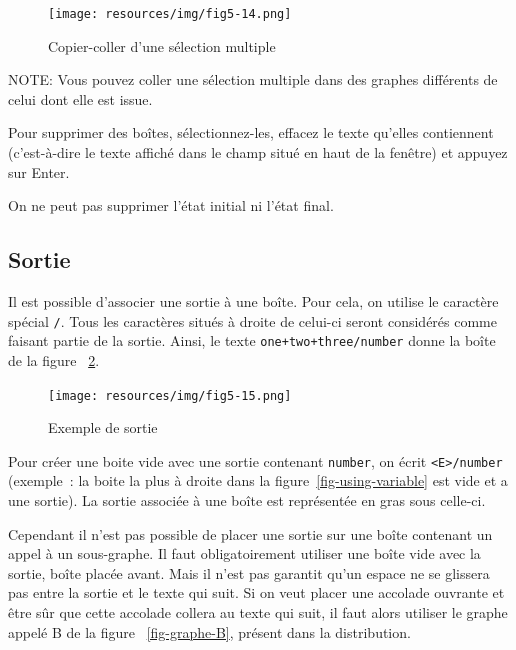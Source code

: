 \begin{figure}[!ht]
\begin{center}
\texttt{[image: resources/img/fig5-14.png]}
\caption{Copier-coller d’une sélection multiple\label{copy-paste-multi-selection}}
\end{center}
\end{figure}

\bigskip
\noindent NOTE: Vous pouvez coller une sélection multiple dans des graphes différents de celui dont
elle est issue.

\bigskip
{}
\noindent Pour supprimer des boîtes, sélectionnez-les, effacez le texte qu'elles contiennent
(c'est-à-dire le texte affiché dans le champ situé en haut de la fenêtre)
 et appuyez sur Enter.

\bigskip
\noindent On ne peut pas supprimer l'état initial ni l'état final.

\subsection{Sortie}
\label{Transducers}\index{\verbc{/}}
Il est possible d’associer une sortie à une boîte. Pour cela, on utilise le caractère spécial
\verb+/+. Tous les caractères situés à droite de celui-ci seront considérés comme faisant partie de
la sortie. Ainsi, le texte \verb$one+two+three/number$ donne la boîte de la figure
~\ref{fig-exemple-transduction}.

\begin{figure}[!ht]
\begin{center}
\texttt{[image: resources/img/fig5-15.png]}
\caption{Exemple de sortie\label{fig-exemple-transduction}}
\end{center}
\end{figure}

\bigskip
\noindent Pour créer une boite vide avec une sortie contenant \verb+number+, on écrit \verb+<E>/number+ (exemple~: la boite la plus à droite dans la figure~\ref{fig-using-variable} est vide et a une sortie). La sortie associée à une boîte est représentée en gras
sous celle-ci.

\bigskip
\noindent Cependant il n'est pas possible de placer une sortie sur une boîte contenant un appel à un sous-graphe. Il faut obligatoirement utiliser une boîte vide avec la sortie, boîte placée avant. Mais il n'est pas garantit qu'un espace ne se glissera pas entre la sortie et le texte qui suit. Si on veut placer une accolade ouvrante et être sûr que cette accolade collera au texte qui suit, il faut alors utiliser le graphe appelé B de la figure ~\ref{fig-graphe-B}, présent dans la distribution.

